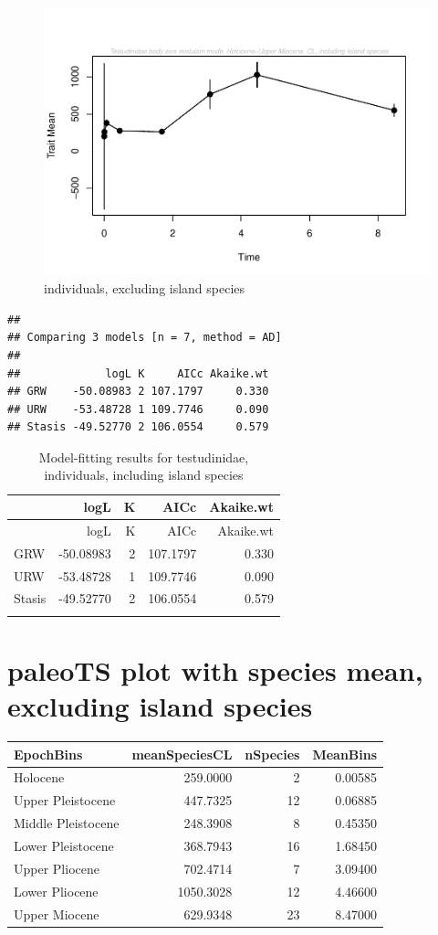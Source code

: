 \documentclass[]{article}
\begin{document}
\begin{figure}[htbp]
\centering
\includegraphics{MA_JJ_files/figure-latex/paleoTS, individuals, exluding island species-1.pdf}
\caption{individuals, excluding island species}
\end{figure}

\begin{verbatim}
## 
## Comparing 3 models [n = 7, method = AD]
## 
##             logL K     AICc Akaike.wt
## GRW    -50.08983 2 107.1797     0.330
## URW    -53.48728 1 109.7746     0.090
## Stasis -49.52770 2 106.0554     0.579
\end{verbatim}

\begin{longtable}[]{@{}lrrrr@{}}
\caption{Model-fitting results for testudinidae, individuals, including
island species}\tabularnewline
\toprule
& logL & K & AICc & Akaike.wt\tabularnewline
\midrule
\endfirsthead
\toprule
& logL & K & AICc & Akaike.wt\tabularnewline
\midrule
\endhead
GRW & -50.08983 & 2 & 107.1797 & 0.330\tabularnewline
URW & -53.48728 & 1 & 109.7746 & 0.090\tabularnewline
Stasis & -49.52770 & 2 & 106.0554 & 0.579\tabularnewline
\newpage & & & &\tabularnewline
\bottomrule
\end{longtable}

\section{paleoTS plot with species mean, excluding island
species}\label{paleots-plot-with-species-mean-excluding-island-species}

\begin{longtable}[]{@{}lrrr@{}}
\toprule
EpochBins & meanSpeciesCL & nSpecies & MeanBins\tabularnewline
\midrule
\endhead
Holocene & 259.0000 & 2 & 0.00585\tabularnewline
Upper Pleistocene & 447.7325 & 12 & 0.06885\tabularnewline
Middle Pleistocene & 248.3908 & 8 & 0.45350\tabularnewline
Lower Pleistocene & 368.7943 & 16 & 1.68450\tabularnewline
Upper Pliocene & 702.4714 & 7 & 3.09400\tabularnewline
Lower Pliocene & 1050.3028 & 12 & 4.46600\tabularnewline
Upper Miocene & 629.9348 & 23 & 8.47000\tabularnewline
\bottomrule
\end{longtable}
\end{document}
